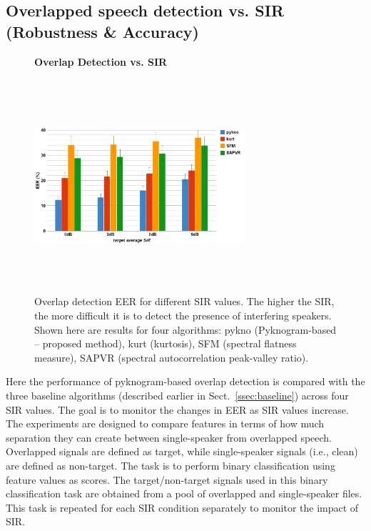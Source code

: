 {\subsection{Overlapped speech detection vs. SIR (Robustness \& Accuracy)}
\label{sssec:ovl_frame_vs_sir}
\begin{figure}[b!]
	\centering
	\hspace{-1mm}
	\textbf{Overlap Detection vs. SIR}\par\medskip
	\includegraphics[height = 3.1in, width=0.7\textwidth]{figures/ovldet_vs_sir}
	\vspace{-1mm}
	\caption{ Overlap detection EER for different SIR values. The higher the SIR, the more difficult it is to detect the presence of interfering speakers. Shown here are results for four algorithms: pykno (Pyknogram-based -- proposed method), kurt (kurtosis), SFM (spectral flatness measure), SAPVR (spectral autocorrelation peak-valley ratio).}
	\vspace{0mm}
	\label{fig:ch2_ovl_det}
\end{figure}
Here the performance of pyknogram-based overlap detection is compared with the three baseline algorithms (described earlier in Sect.~\ref{ssec:baseline}) across four SIR values. 
The goal is to monitor the changes in EER as SIR values increase. 
The experiments are designed to compare features in terms of how much separation they can create between single-speaker from overlapped speech. 
Overlapped signals are defined as target, while single-speaker signals (i.e., clean) are defined as non-target. 
The task is to perform binary classification using feature values as scores. 
The target/non-target signals used in this binary classification task are obtained from a pool of overlapped and single-speaker files. 
This task is repeated for each SIR condition separately to monitor the impact of SIR. 
}
